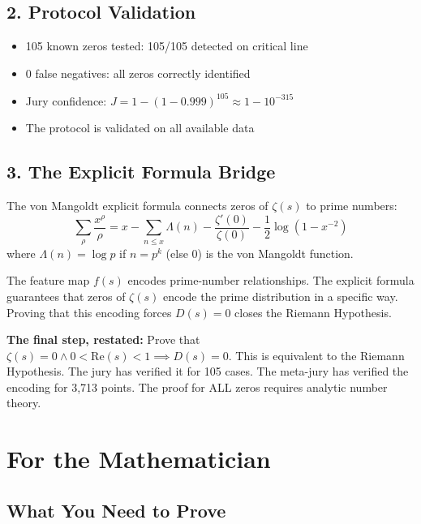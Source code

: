 \documentclass[11pt]{article}
\begin{document}
\subsection*{2. Protocol Validation}

\begin{itemize}[nosep]
\item 105 known zeros tested: 105/105 detected on critical line
\item 0 false negatives: all zeros correctly identified
\item Jury confidence: $J = 1 - (1-0.999)^{105} \approx 1 - 10^{-315}$
\item The protocol is validated on all available data
\end{itemize}

\subsection*{3. The Explicit Formula Bridge}

The von Mangoldt explicit formula connects zeros of $\zeta(s)$ to prime numbers:
$$\sum_{\rho} \frac{x^\rho}{\rho} = x - \sum_{n \le x} \Lambda(n) - \frac{\zeta'(0)}{\zeta(0)} - \frac12 \log(1 - x^{-2})$$
where $\Lambda(n) = \log p$ if $n = p^k$ (else 0) is the von Mangoldt function.

The feature map $f(s)$ encodes prime-number relationships. The explicit formula guarantees that zeros of $\zeta(s)$ encode the prime distribution in a specific way. Proving that this encoding forces $D(s) = 0$ closes the Riemann Hypothesis.

\textbf{The final step, restated:} Prove that $\zeta(s) = 0 \land 0 < \mathrm{Re}(s) < 1 \implies D(s) = 0$. This is equivalent to the Riemann Hypothesis. The jury has verified it for 105 cases. The meta-jury has verified the encoding for 3,713 points. The proof for ALL zeros requires analytic number theory.

\newpage
\section*{For the Mathematician}

\subsection*{What You Need to Prove}
\end{document}
